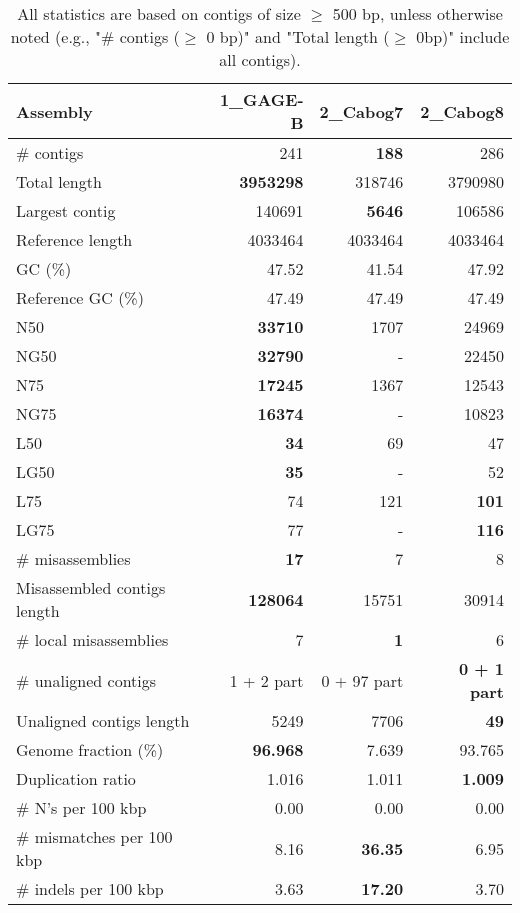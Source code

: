 \documentclass[12pt,a4paper]{article}
\begin{document}
\begin{table}[ht]
\begin{center}
\caption{All statistics are based on contigs of size $\geq$ 500 bp, unless otherwise noted (e.g., "\# contigs ($\geq$ 0 bp)" and "Total length ($\geq$ 0bp)" include all contigs).}
\begin{tabular}{|l*{3}{|r}|}
\hline
Assembly & 1\_GAGE-B & 2\_Cabog7 & 2\_Cabog8 \\ \hline
\# contigs & 241 & {\bf 188} & 286 \\ \hline
Total length & {\bf 3953298} & 318746 & 3790980 \\ \hline
Largest contig & 140691 & {\bf 5646} & 106586 \\ \hline
Reference length & 4033464 & 4033464 & 4033464 \\ \hline
GC (\%) & 47.52 & 41.54 & 47.92 \\ \hline
Reference GC (\%) & 47.49 & 47.49 & 47.49 \\ \hline
N50 & {\bf 33710} & 1707 & 24969 \\ \hline
NG50 & {\bf 32790} & - & 22450 \\ \hline
N75 & {\bf 17245} & 1367 & 12543 \\ \hline
NG75 & {\bf 16374} & - & 10823 \\ \hline
L50 & {\bf 34} & 69 & 47 \\ \hline
LG50 & {\bf 35} & - & 52 \\ \hline
L75 & 74 & 121 & {\bf 101} \\ \hline
LG75 & 77 & - & {\bf 116} \\ \hline
\# misassemblies & {\bf 17} & 7 & 8 \\ \hline
Misassembled contigs length & {\bf 128064} & 15751 & 30914 \\ \hline
\# local misassemblies & 7 & {\bf 1} & 6 \\ \hline
\# unaligned contigs & 1 + 2 part & 0 + 97 part & {\bf 0 + 1 part} \\ \hline
Unaligned contigs length & 5249 & 7706 & {\bf 49} \\ \hline
Genome fraction (\%) & {\bf 96.968} & 7.639 & 93.765 \\ \hline
Duplication ratio & 1.016 & 1.011 & {\bf 1.009} \\ \hline
\# N's per 100 kbp & 0.00 & 0.00 & 0.00 \\ \hline
\# mismatches per 100 kbp & 8.16 & {\bf 36.35} & 6.95 \\ \hline
\# indels per 100 kbp & 3.63 & {\bf 17.20} & 3.70 \\ \hline

\end{tabular}
\end{center}
\end{table}
\end{document}
